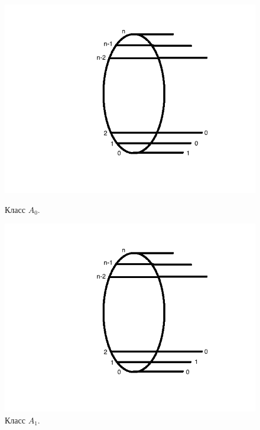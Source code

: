 \documentclass[oneside, final, 12pt]{extreport}
\begin{document}
 \begin{figure}[h]
 	\begin{center}
 		\begin{minipage}[h]{0.3\linewidth}
 			\includegraphics[width=1\linewidth]{A0}
 			\caption{Класс $A_0$.} %
 			\label{ris:A0} %
 		\end{minipage}
 		\hfill 
 		\begin{minipage}[h]{0.3\linewidth}
 			\includegraphics[width=1\linewidth]{A1}
 			\caption{Класс $A_1$.}
 			\label{ris:A1}
 		\end{minipage}
 		\hfill 
 		\begin{minipage}[h]{0.3\linewidth}

\end{minipage}
\end{center}
\end{figure}
\end{document}

